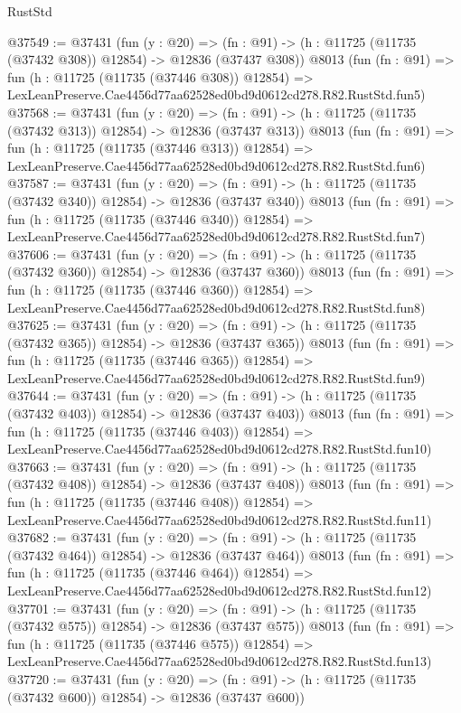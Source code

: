 \begin{lexlean}{RustStd}
\begin{coremodule}
@37549 := @37431
    (fun (y : @20) =>
    (fn : @91) -> (h : @11725 (@11735 (@37432 @308)) @12854) -> @12836 (@37437 @308))
    @8013
    (fun (fn : @91) =>
    fun (h : @11725 (@11735 (@37446 @308)) @12854) =>
    LexLeanPreserve.Cae4456d77aa62528ed0bd9d0612cd278.R82.RustStd.fun5)
@37568 := @37431
    (fun (y : @20) =>
    (fn : @91) -> (h : @11725 (@11735 (@37432 @313)) @12854) -> @12836 (@37437 @313))
    @8013
    (fun (fn : @91) =>
    fun (h : @11725 (@11735 (@37446 @313)) @12854) =>
    LexLeanPreserve.Cae4456d77aa62528ed0bd9d0612cd278.R82.RustStd.fun6)
@37587 := @37431
    (fun (y : @20) =>
    (fn : @91) -> (h : @11725 (@11735 (@37432 @340)) @12854) -> @12836 (@37437 @340))
    @8013
    (fun (fn : @91) =>
    fun (h : @11725 (@11735 (@37446 @340)) @12854) =>
    LexLeanPreserve.Cae4456d77aa62528ed0bd9d0612cd278.R82.RustStd.fun7)
@37606 := @37431
    (fun (y : @20) =>
    (fn : @91) -> (h : @11725 (@11735 (@37432 @360)) @12854) -> @12836 (@37437 @360))
    @8013
    (fun (fn : @91) =>
    fun (h : @11725 (@11735 (@37446 @360)) @12854) =>
    LexLeanPreserve.Cae4456d77aa62528ed0bd9d0612cd278.R82.RustStd.fun8)
@37625 := @37431
    (fun (y : @20) =>
    (fn : @91) -> (h : @11725 (@11735 (@37432 @365)) @12854) -> @12836 (@37437 @365))
    @8013
    (fun (fn : @91) =>
    fun (h : @11725 (@11735 (@37446 @365)) @12854) =>
    LexLeanPreserve.Cae4456d77aa62528ed0bd9d0612cd278.R82.RustStd.fun9)
@37644 := @37431
    (fun (y : @20) =>
    (fn : @91) -> (h : @11725 (@11735 (@37432 @403)) @12854) -> @12836 (@37437 @403))
    @8013
    (fun (fn : @91) =>
    fun (h : @11725 (@11735 (@37446 @403)) @12854) =>
    LexLeanPreserve.Cae4456d77aa62528ed0bd9d0612cd278.R82.RustStd.fun10)
@37663 := @37431
    (fun (y : @20) =>
    (fn : @91) -> (h : @11725 (@11735 (@37432 @408)) @12854) -> @12836 (@37437 @408))
    @8013
    (fun (fn : @91) =>
    fun (h : @11725 (@11735 (@37446 @408)) @12854) =>
    LexLeanPreserve.Cae4456d77aa62528ed0bd9d0612cd278.R82.RustStd.fun11)
@37682 := @37431
    (fun (y : @20) =>
    (fn : @91) -> (h : @11725 (@11735 (@37432 @464)) @12854) -> @12836 (@37437 @464))
    @8013
    (fun (fn : @91) =>
    fun (h : @11725 (@11735 (@37446 @464)) @12854) =>
    LexLeanPreserve.Cae4456d77aa62528ed0bd9d0612cd278.R82.RustStd.fun12)
@37701 := @37431
    (fun (y : @20) =>
    (fn : @91) -> (h : @11725 (@11735 (@37432 @575)) @12854) -> @12836 (@37437 @575))
    @8013
    (fun (fn : @91) =>
    fun (h : @11725 (@11735 (@37446 @575)) @12854) =>
    LexLeanPreserve.Cae4456d77aa62528ed0bd9d0612cd278.R82.RustStd.fun13)
@37720 := @37431
    (fun (y : @20) =>
    (fn : @91) -> (h : @11725 (@11735 (@37432 @600)) @12854) -> @12836 (@37437 @600))

\end{coremodule}
\end{lexlean}
